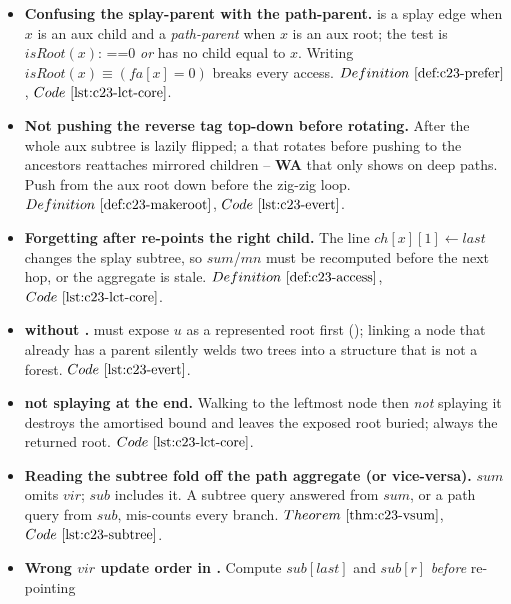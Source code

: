 
\begin{itemize}[nosep, leftmargin=1.4em]
  \item \textbf{Confusing the splay-parent with the path-parent.}  is a splay edge
        when \(x\) is an aux child and a \emph{path-parent} when \(x\) is an aux root; the test
        is \(\mathit{isRoot}(x)\): ==0 \emph{or}  has no child equal to \(x\).
        Writing \(\mathit{isRoot}(x)\equiv(\mathit{fa}[x]=0)\) breaks every access. \(\defref{c23-prefer}\), \(\coderef{c23-lct-core}\).
  \item \textbf{Not pushing the reverse tag top-down before rotating.} After  the
        whole aux subtree is lazily flipped; a  that rotates before pushing 
        to the ancestors reattaches mirrored children -- \textbf{WA} that only shows on deep
        paths. Push from the aux root down before the zig-zig loop. \(\defref{c23-makeroot}\), \(\coderef{c23-evert}\).
  \item \textbf{Forgetting  after  re-points the right child.} The line
        \(\mathit{ch}[x][1]\leftarrow\mathit{last}\) changes the splay subtree, so \(\mathit{sum}\)/\(\mathit{mn}\)
        must be recomputed before the next hop, or the aggregate is stale. \(\defref{c23-access}\), \(\coderef{c23-lct-core}\).
  \item \textbf{ without .}  must expose \(u\) as a
        represented root first (); linking a node that already has a
        parent silently welds two trees into a structure that is not a forest. \(\coderef{c23-evert}\).
  \item \textbf{ not splaying at the end.} Walking to the leftmost node then
        \emph{not} splaying it destroys the amortised bound and leaves the exposed root buried;
        always  the returned root. \(\coderef{c23-lct-core}\).
  \item \textbf{Reading the subtree fold off the path aggregate (or vice-versa).} \(\mathit{sum}\)
        omits \(\mathit{vir}\); \(\mathit{sub}\) includes it. A subtree query answered from
        \(\mathit{sum}\), or a path query from \(\mathit{sub}\), mis-counts every branch. \(\thmref{c23-vsum}\), \(\coderef{c23-subtree}\).
  \item \textbf{Wrong \(\mathit{vir}\) update order in .} Compute
        \(\mathit{sub}[\mathit{last}]\) and \(\mathit{sub}[r]\) \emph{before} re-pointing

\end{itemize}
